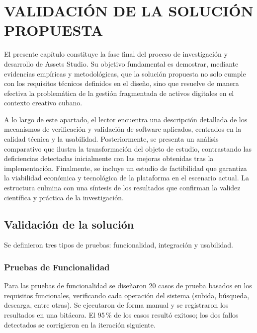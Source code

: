 \chapter{VALIDACIÓN DE LA SOLUCIÓN PROPUESTA}
\label{chap:chapter3}

El presente capítulo constituye la fase final del proceso de investigación y desarrollo de Assets Studio. Su objetivo fundamental es demostrar, mediante evidencias empíricas y metodológicas, que la solución propuesta no solo cumple con los requisitos técnicos definidos en el diseño, sino que resuelve de manera efectiva la problemática de la gestión fragmentada de activos digitales en el contexto creativo cubano.

A lo largo de este apartado, el lector encuentra una descripción detallada de los mecanismos de verificación y validación de software aplicados, centrados en la calidad técnica y la usabilidad. Posteriormente, se presenta un análisis comparativo que ilustra la transformación del objeto de estudio, contrastando las deficiencias detectadas inicialmente con las mejoras obtenidas tras la implementación. Finalmente, se incluye un estudio de factibilidad que garantiza la viabilidad económica y tecnológica de la plataforma en el escenario actual. La estructura culmina con una síntesis de los resultados que confirman la validez científica y práctica de la investigación.

\section{Validación de la solución}
\label{sec:III_1}

Se definieron tres tipos de pruebas: funcionalidad, integración y usabilidad.

\subsection{Pruebas de Funcionalidad}

Para las pruebas de funcionalidad se diseñaron 20 casos de prueba basados en los requisitos funcionales, verificando cada operación del sistema (subida, búsqueda, descarga, entre otras). Se ejecutaron de forma manual y se registraron los resultados en una bitácora. El 95\,\% de los casos resultó exitoso; los dos fallos detectados se corrigieron en la iteración siguiente.

\begin{figure}[H]
    \centering
    {}
\end{figure}

